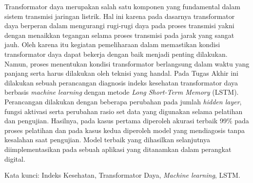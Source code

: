 Transformator daya merupakan salah satu komponen yang fundamental dalam sistem transmisi jaringan listrik. Hal ini karena pada dasarnya transformator daya berperan dalam mengurangi rugi-rugi daya pada proses transmisi yakni dengan menaikkan tegangan selama proses transmisi pada jarak yang sangat jauh. Oleh karena itu kegiatan pemeliharaan dalam memastikan kondisi transformator daya dapat bekerja dengan baik menjadi penting dilakukan. Namun, proses menentukan kondisi transformator berlangsung dalam waktu yang panjang serta harus dilakukan oleh teknisi yang handal. Pada Tugas Akhir ini dilakukan sebuah perancangan diagnosis indeks kesehatan transformator daya berbasis \textit{machine learning} dengan metode \textit{Long Short-Term Memory} (LSTM). Perancangan dilakukan dengan beberapa perubahan pada jumlah \textit{hidden layer}, fungsi aktivasi serta perubahan rasio set data yang digunakan selama pelatihan dan pengujian. Hasilnya, pada kasus pertama diperoleh akurasi terbaik 99\% pada proses pelatihan dan pada kasus kedua diperoleh model yang mendiagosis tanpa kesalahan saat pengujian. Model terbaik yang dihasilkan selanjutnya diimplementasikan pada sebuah aplikasi yang ditanamkan dalam perangkat digital.

Kata kunci: Indeks Kesehatan, Transformator Daya, \textit{Machine learning}, LSTM.